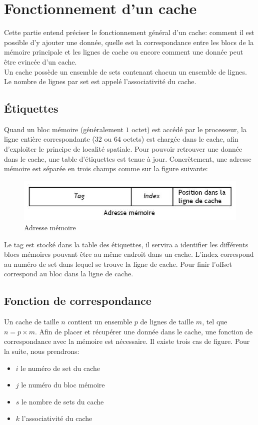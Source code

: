 \documentclass[a4paper]{article}
\begin{document}
\newpage
\section{Fonctionnement d'un cache}
\indent Cette partie entend préciser le fonctionnement général d'un cache: comment il est possible d'y ajouter une donnée, quelle est la correspondance entre les blocs de la mémoire principale et les lignes de cache ou encore comment une donnée peut être evincée d'un cache. \\

\indent Un cache possède un ensemble de sets contenant chacun un ensemble de lignes. Le nombre de lignes par set est appelé l'associativité du cache.

\subsection{\'Etiquettes}
\indent Quand un bloc mémoire (généralement $1$ octet) est accédé par le processeur, la ligne entière correspondante ($32$ ou $64$ octets) est chargée dans le cache, afin d'exploiter le principe de localité spatiale. Pour pouvoir retrouver une donnée dans le cache, une table d'étiquettes est tenue à jour. Concrètement, une adresse mémoire est séparée en trois champs comme sur la figure suivante: \\

\begin{figure}[!h]
\begin{center}
   \includegraphics[scale=0.50]{etiquette.jpeg}
   \caption{\label{etiquette} Adresse mémoire}
\end{center}
\end{figure}

\indent Le tag est stocké dans la table des étiquettes, il servira a identifier les différents blocs mémoires pouvant être au même endroit dans un cache. L'index correspond au numéro de set dans lequel se trouve la ligne de cache. Pour finir l'offset correspond au bloc dans la ligne de cache.

\subsection{Fonction de correspondance}
\indent Un cache de taille $n$ contient un ensemble $p$ de lignes de taille $m$, tel que $n = p \times m$. Afin de placer et récupérer une donnée dans le cache, une fonction de correspondance avec la mémoire est nécessaire. Il existe trois cas de figure. Pour la suite, nous prendrons: \\
\begin{itemize}
\item $i$ le numéro de set du cache
\item $j$ le numéro du bloc mémoire
\item $s$ le nombre de sets du cache
\item $k$ l'associativité du cache 
\end{itemize}
\end{document}
